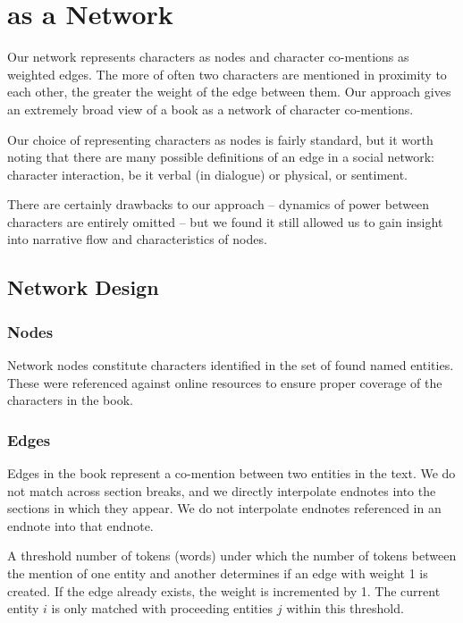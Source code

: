 \section{\infinitejest as a Network}

Our network represents characters as nodes and character co-mentions as weighted edges. The more of often two characters are mentioned in proximity to each other, the greater the weight of the edge between them. Our approach gives an extremely broad view of a book as a network of character co-mentions.

Our choice of representing characters as nodes is fairly standard, but it worth noting that there are many possible definitions of an edge in a social network: character interaction, be it verbal (in dialogue) or physical, or sentiment. 

There are certainly drawbacks to our approach -- dynamics of power between characters are entirely omitted -- but we found it still allowed us to gain insight into narrative flow and characteristics of nodes.

\subsection{Network Design}

\subsubsection{Nodes}
Network nodes constitute characters identified in the set of found named entities. These were referenced against online resources to ensure proper coverage of the characters in the book.\cite{david_foster_wallace_wiki}

\subsubsection{Edges}
Edges in the book represent a co-mention between two entities in the text. We do not match across section breaks, and we directly interpolate endnotes into the sections in which they appear. We do not interpolate endnotes referenced in an endnote into that endnote.

A threshold number of tokens (words) under which the number of tokens between the mention of one entity and another determines if an edge with weight 1 is created. If the edge already exists, the weight is incremented by 1. The current entity $i$ is only matched with proceeding entities $j$ within this threshold.

